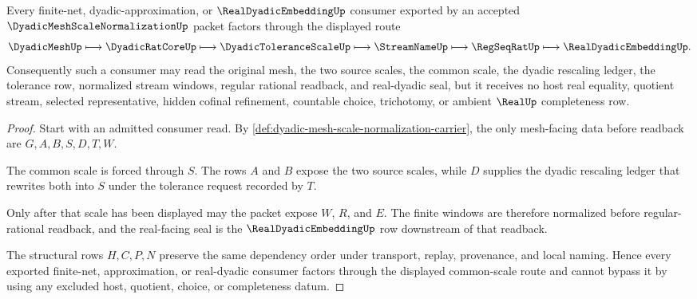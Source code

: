 \begin{theorem}
\label{thm:dyadic-mesh-scale-normalization-common-scale-exhaustion}
Every finite-net, dyadic-approximation, or $\RealDyadicEmbeddingUp$ consumer exported by an accepted $\DyadicMeshScaleNormalizationUp$ packet factors through the displayed route
$$
\DyadicMeshUp \longmapsto \DyadicRatCoreUp \longmapsto \DyadicToleranceScaleUp \longmapsto \StreamNameUp \longmapsto \RegSeqRatUp \longmapsto \RealDyadicEmbeddingUp .
$$
Consequently such a consumer may read the original mesh, the two source scales, the common scale, the dyadic rescaling ledger, the tolerance row, normalized stream windows, regular rational readback, and real-dyadic seal, but it receives no host real equality, quotient stream, selected representative, hidden cofinal refinement, countable choice, trichotomy, or ambient $\RealUp$ completeness row.
\end{theorem}
\begin{proof}
Start with an admitted consumer read. By \autoref{def:dyadic-mesh-scale-normalization-carrier}, the only mesh-facing data before readback are $G,A,B,S,D,T,W$.

The common scale is forced through $S$. The rows $A$ and $B$ expose the two source scales, while $D$ supplies the dyadic rescaling ledger that rewrites both into $S$ under the tolerance request recorded by $T$.

Only after that scale has been displayed may the packet expose $W$, $R$, and $E$. The finite windows are therefore normalized before regular-rational readback, and the real-facing seal is the $\RealDyadicEmbeddingUp$ row downstream of that readback.

The structural rows $H,C,P,N$ preserve the same dependency order under transport, replay, provenance, and local naming. Hence every exported finite-net, approximation, or real-dyadic consumer factors through the displayed common-scale route and cannot bypass it by using any excluded host, quotient, choice, or completeness datum.
\end{proof}


